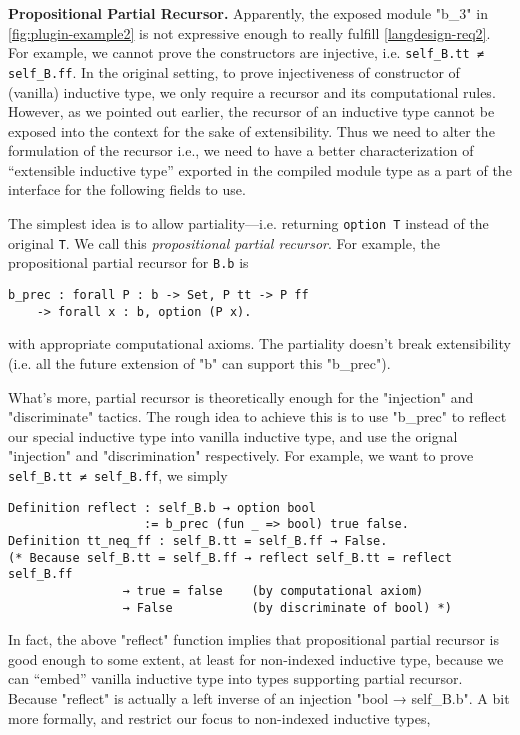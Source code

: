 \textbf{Propositional Partial Recursor.}
Apparently, the exposed module "b_3" in \cref{fig:plugin-example2} is not expressive enough to really fulfill \ref{langdesign-req2}. For example, we cannot prove the constructors are injective, i.e. \texttt{self_B.tt ≠ self_B.ff}. In the original setting, to prove injectiveness of constructor of (vanilla) inductive type, we only require a recursor and its computational rules. However, as we pointed out earlier, the recursor of an inductive type cannot be exposed into the context for the sake of extensibility. Thus we need to alter the formulation of the recursor i.e., we need to have a better characterization of ``extensible inductive type'' exported in the compiled module type as a part of the interface for the following fields to use.


The simplest idea is to allow partiality---i.e. returning \texttt{option T} instead of the original \texttt{T}. We call this \textit{propositional partial recursor}. For example, the propositional partial recursor for \texttt{B.b} is 
\begin{verbatim}
b_prec : forall P : b -> Set, P tt -> P ff 
    -> forall x : b, option (P x). 
\end{verbatim}
with appropriate computational axioms. The partiality doesn't break extensibility (i.e. all the future extension of "b" can support this "b_prec"). 

What's more, partial recursor is theoretically enough for the "injection" and "discriminate" tactics. The rough idea to achieve this is to use "b_prec" to reflect our special inductive type into vanilla inductive type, and use the orignal "injection" and "discrimination" respectively. For example, we want to prove \texttt{self_B.tt ≠ self_B.ff}, we simply 
\begin{verbatim}
Definition reflect : self_B.b → option bool 
                   := b_prec (fun _ => bool) true false.
Definition tt_neq_ff : self_B.tt = self_B.ff → False.
(* Because self_B.tt = self_B.ff → reflect self_B.tt = reflect self_B.ff 
                → true = false    (by computational axiom)
                → False           (by discriminate of bool) *)
\end{verbatim}



In fact, the above "reflect" function implies that propositional partial recursor is good enough to some extent, at least for non-indexed inductive type, because we can ``embed'' vanilla inductive type into types supporting partial recursor. Because "reflect" is actually a left inverse of an injection "bool → self_B.b". A bit more formally, and restrict our focus to non-indexed inductive types,

